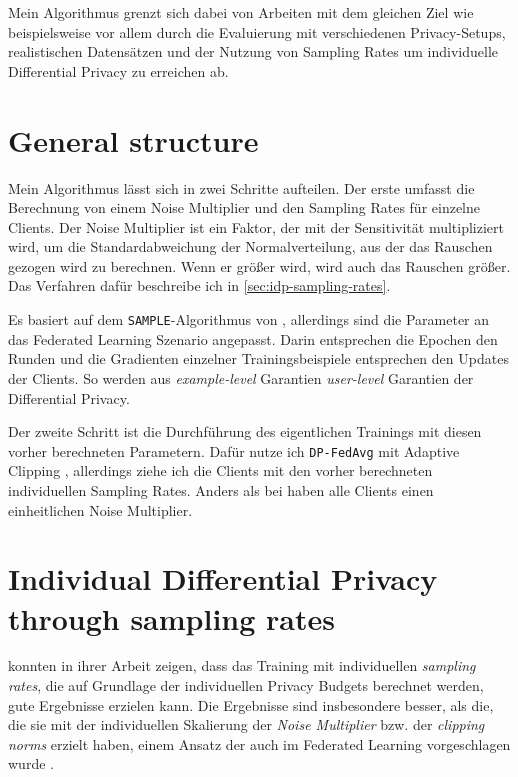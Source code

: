 Mein Algorithmus grenzt sich dabei von Arbeiten mit dem gleichen Ziel wie beispielsweise \textcite{aldaghri:2023} vor allem durch die Evaluierung mit verschiedenen Privacy-Setups, realistischen Datensätzen und der Nutzung von Sampling Rates um individuelle Differential Privacy zu erreichen ab.

\section{General structure}
Mein Algorithmus lässt sich in zwei Schritte aufteilen. Der erste umfasst die Berechnung von einem Noise Multiplier und den Sampling Rates für einzelne Clients. Der Noise Multiplier ist ein Faktor, der mit der Sensitivität multipliziert wird, um die Standardabweichung der Normalverteilung, aus der das Rauschen gezogen wird zu berechnen. Wenn er größer wird, wird auch das Rauschen größer. Das Verfahren dafür beschreibe ich in \autoref{sec:idp-sampling-rates}. 

Es basiert auf dem \texttt{SAMPLE}-Algorithmus von \textcite{boenisch:2023}, allerdings sind die Parameter an das Federated Learning Szenario angepasst. Darin entsprechen die Epochen den Runden und die Gradienten einzelner Trainingsbeispiele entsprechen den Updates der Clients. So werden aus \textit{example-level} Garantien \textit{user-level} Garantien der Differential Privacy.

Der zweite Schritt ist die Durchführung des eigentlichen Trainings mit diesen vorher berechneten Parametern. Dafür nutze ich \texttt{DP-FedAvg} mit Adaptive Clipping \cite{andrew:2021}, allerdings ziehe ich die Clients mit den vorher berechneten individuellen Sampling Rates. Anders als bei \citeauthor{aldaghri:2023} haben alle Clients einen einheitlichen Noise Multiplier.

\section{Individual Differential Privacy through sampling rates}\label{sec:idp-sampling-rates}

\textcite{boenisch:2023} konnten in ihrer Arbeit zeigen, dass das Training mit individuellen \textit{sampling rates}, die auf Grundlage der individuellen Privacy Budgets berechnet werden, gute Ergebnisse erzielen kann. Die Ergebnisse sind insbesondere besser, als die, die sie mit der individuellen Skalierung der \textit{Noise Multiplier} bzw. der \textit{clipping norms} erzielt haben, einem Ansatz der auch im Federated Learning vorgeschlagen wurde \cite{aldaghri:2023}. 

